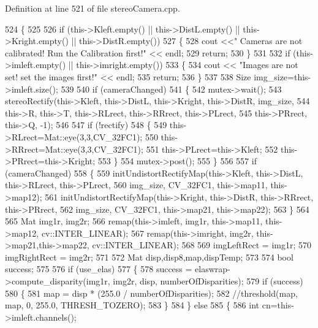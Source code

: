 Definition at line 521 of file stereo\+Camera.\+cpp.


\begin{DoxyCode}
524 \{
525 
526     \textcolor{keywordflow}{if} (this->Kleft.empty() || this->DistL.empty() || this->Kright.empty() || this->DistR.empty())
527     \{
528         cout <<\textcolor{stringliteral}{" Cameras are not calibrated! Run the Calibration first!"} << endl;
529         \textcolor{keywordflow}{return};
530     \}
531 
532     \textcolor{keywordflow}{if} (this->imleft.empty() || this->imright.empty())
533     \{
534         cout << \textcolor{stringliteral}{"Images are not set! set the images first!"} << endl;
535         \textcolor{keywordflow}{return};
536     \}
537 
538     Size img\_size=this->imleft.size();
539 
540     \textcolor{keywordflow}{if} (cameraChanged)
541     \{
542         mutex->wait();
543         stereoRectify(this->Kleft, this->DistL, this->Kright, this->DistR, img\_size,
544                 this->R, this->T, this->RLrect, this->RRrect, this->PLrect,
545                 this->PRrect, this->Q, -1);
546 
547         \textcolor{keywordflow}{if} (!rectify)
548         \{
549             this->RLrect=Mat::eye(3,3,CV\_32FC1);
550             this->RRrect=Mat::eye(3,3,CV\_32FC1);
551             this->PLrect=this->Kleft;
552             this->PRrect=this->Kright;
553         \}
554         mutex->post();
555     \}
556 
557     \textcolor{keywordflow}{if} (cameraChanged)
558     \{
559         initUndistortRectifyMap(this->Kleft, this->DistL, this->RLrect, this->PLrect,
560                 img\_size, CV\_32FC1, this->map11, this->map12);
561         initUndistortRectifyMap(this->Kright,  this->DistR, this->RRrect, this->PRrect,
562                 img\_size, CV\_32FC1, this->map21, this->map22);
563     \}
564 
565     Mat img1r, img2r;
566     remap(this->imleft, img1r, this->map11, this->map12, cv::INTER\_LINEAR);
567     remap(this->imright, img2r, this->map21,this->map22, cv::INTER\_LINEAR);
568 
569     imgLeftRect = img1r;
570     imgRightRect = img2r;
571 
572     Mat disp,disp8,map,dispTemp;
573 
574     \textcolor{keywordtype}{bool} success;
575 
576     \textcolor{keywordflow}{if} (use\_elas)
577     \{
578         success = elaswrap->compute\_disparity(img1r, img2r, disp, numberOfDisparities);
579         \textcolor{keywordflow}{if} (success)
580         \{
581             map = disp * (255.0 / numberOfDisparities);
582             \textcolor{comment}{//threshold(map, map, 0, 255.0, THRESH\_TOZERO);}
583         \}
584     \} \textcolor{keywordflow}{else}
585     \{
586         \textcolor{keywordtype}{int} cn=this->imleft.channels();

\end{DoxyCode}
